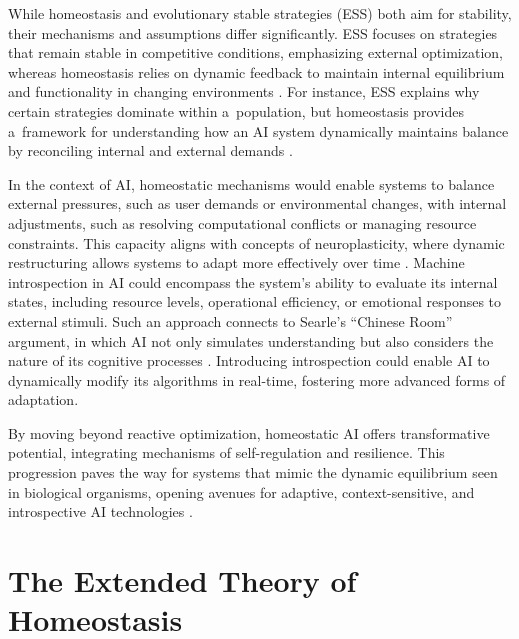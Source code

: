 \documentclass[%
  manuscript=article,
  year=2024,
  volume=77,
  doi=00000.000,
]{zfn}
\begin{document}
While homeostasis and evolutionary stable strategies (ESS) both aim for stability, their mechanisms and assumptions differ significantly. ESS focuses on strategies that remain stable in competitive conditions, emphasizing external optimization, whereas homeostasis relies on dynamic feedback to maintain internal equilibrium and functionality in changing environments 
\parencites[][]{maynard_smith_theory_1974}[][]{dawkins_selfish_1989}. %
 For instance, ESS explains why certain strategies dominate within a~population, but homeostasis provides a~framework for understanding how an AI system dynamically maintains balance by reconciling internal and external demands 
\parencites[][]{walter_imitation_1950}[][]{ashby_design_1952}.%




In the context of AI, homeostatic mechanisms would enable systems to balance external pressures, such as user demands or environmental changes, with internal adjustments, such as resolving computational conflicts or managing resource constraints. This capacity aligns with concepts of neuroplasticity, where dynamic restructuring allows systems to adapt more effectively over time 
\parencite[][]{zhang_dynamic_2022}. %
 Machine introspection in AI could encompass the system's ability to evaluate its internal states, including resource levels, operational efficiency, or emotional responses to external stimuli. Such an approach connects to Searle's ``Chinese Room'' argument, in which AI not only simulates understanding but also considers the nature of its cognitive processes 
\parencite[][]{searle_minds_1980}. %
 Introducing introspection could enable AI to dynamically modify its algorithms in real-time, fostering more advanced forms of adaptation.



By moving beyond reactive optimization, homeostatic AI offers transformative potential, integrating mechanisms of self-regulation and resilience. This progression paves the way for systems that mimic the dynamic equilibrium seen in biological organisms, opening avenues for adaptive, context-sensitive, and introspective AI technologies 
\parencite[][]{tegmark_life_2018}.%




\section*{The Extended Theory of Homeostasis}
\end{document}
